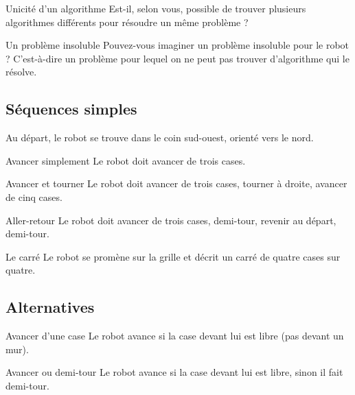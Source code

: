 \begin{Exercice}{Unicité d'un algorithme}
	Est-il, selon vous, possible de trouver 
	plusieurs algorithmes différents
	pour résoudre un même problème ?
\end{Exercice}

\begin{Exercice}{Un problème insoluble}
	Pouvez-vous imaginer un problème insoluble pour le robot ?
	C'est-à-dire un problème pour lequel on ne peut pas
	trouver d'algorithme qui le résolve.
\end{Exercice}

	\subsection{Séquences simples}

		Au départ, le robot se trouve dans le coin sud-ouest, 
		orienté vers le nord.

\begin{Exercice}{Avancer simplement}
	Le robot doit avancer de trois cases.
\end{Exercice}

\begin{Exercice}{Avancer et tourner}
	Le robot doit avancer de trois cases, tourner à droite, 
	avancer de cinq cases.
\end{Exercice}

\begin{Exercice}{Aller-retour}
	Le robot doit avancer de trois cases, demi-tour, 
	revenir au départ, demi-tour.
\end{Exercice}

\begin{Exercice}{Le carré}
	Le robot se promène sur la grille 
	et décrit un carré de quatre cases sur quatre.
\end{Exercice}
		
	\subsection{Alternatives}

\begin{Exercice}{Avancer d'une case}
	Le robot avance si la case devant lui est libre (pas devant un mur).
\end{Exercice}

\begin{Exercice}{Avancer ou demi-tour}
	Le robot avance si la case devant lui est libre,
	sinon il fait demi-tour.
\end{Exercice}

